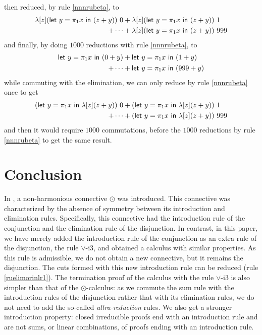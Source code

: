 \documentclass[screen, sigconf,authorversion,nonacm]{acmart}
\theoremstyle{acmdefinition}
\numberwithin{equation}{section}
\newcommand\abstr[1]{[#1]}
\begin{document}
\noindent then reduced, by rule \eqref{nnnrubeta}, to 
\begin{align*}
  {\lambda\abstr{z}(\tletp 1 yx{(z+y)})}~0
  &+
  {\lambda\abstr{z}(\tletp 1 yx{(z+y)})}~1\\
  +\cdots &+
  {\lambda\abstr{z}(\tletp 1 yx{(z+y)})}~999
\end{align*}
and finally, by doing $1000$ reductions with rule \eqref{nnnrubeta}, to 
\begin{align*}
  {\tletp 1 yx{(0+y)}}
  &+
  {\tletp 1 yx{(1+y)}}\\
  +\cdots&+
  {\tletp 1 yx{(999+y)}}
\end{align*}
while commuting with the elimination, we can only reduce by rule \eqref{nnnrubeta} once to get
\begin{align*}
  (\tletp 1 yx{\lambda\abstr{z}(z+y)})~0
  &+
  (\tletp 1 yx{\lambda\abstr{z}(z+y)})~1\\
  +\cdots&+(\tletp 1 yx{\lambda\abstr{z}(z+y)})~999
\end{align*}
and then it would require $1000$ commutations, before the $1000$ reductions by rule \eqref{nnnrubeta} to get the same result.

\section{Conclusion}

In \cite{DiazcaroDowekTCS23}, a non-harmonious connective $\odot$ was
introduced. This connective was characterized by the absence of
symmetry between its introduction and elimination rules. Specifically,
this connective had the introduction rule of the conjunction and the
elimination rule of the disjunction.  In contrast, in this paper, we
have merely added the introduction rule of the conjunction as an extra
rule of the disjunction, the rule $\vee$-i3, and obtained a calculus
with similar properties.  As this rule is admissible, we do not obtain
a new connective, but it remains the disjunction. The cuts formed with
this new introduction rule can be reduced (rule \ref{ruelimorinlr1}).
The termination proof of the calculus with the rule $\vee$-i3 is also
simpler than that of the $\odot$-calculus: as we commute the sum rule
with the introduction rules of the disjunction rather that with its
elimination rules, we do not need to add the so-called {\it
  ultra-reduction} rules. We also get a stronger introduction
property: closed irreducible proofs end with an introduction rule and
are not sums, or linear combinations, of proofs ending with an
introduction rule.
\end{document}
